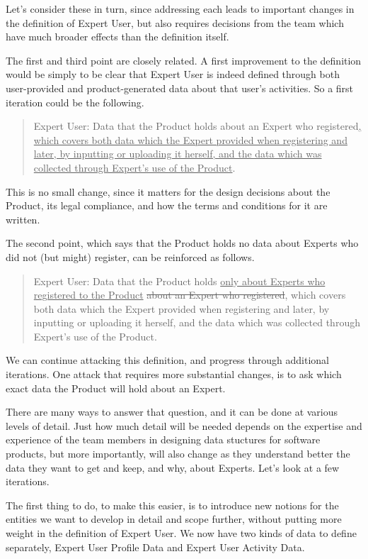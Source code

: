 \documentclass[graybox,envcountchap,sectrefs]{svmono}
\newcommand{\newterm}[1]{\begin{quote}\textsf{#1}\end{quote}}
\newcommand{\nterm}[1]{\textsf{#1}}
\begin{document}
Let's consider these in turn, since addressing each leads to important changes in the definition of \nterm{Expert User}, but also requires decisions from the team which have much broader effects than the definition itself. 

The first and third point are closely related. A first improvement to the definition would be simply to be clear that \nterm{Expert User} is indeed defined through both user-provided and product-generated data about that user's activities. So a first iteration could be the following.

\newterm{Expert User: Data that the Product holds about an Expert who registered\uline{, which covers both data which the Expert provided when registering and later, by inputting or uploading it herself, and the data which was collected through Expert's use of the Product}.}

This is no small change, since it matters for the design decisions about the \nterm{Product}, its legal compliance, and how the terms and conditions for it are written. 

The second point, which says that the \nterm{Product} holds no data about \nterm{Experts} who did not (but might) register, can be reinforced as follows.

\newterm{Expert User: Data that the Product holds \uline{only about Experts who registered to the Product} \sout{about an Expert who registered}, which covers both data which the Expert provided when registering and later, by inputting or uploading it herself, and the data which was collected through Expert's use of the Product.}

We can continue attacking this definition, and progress through additional iterations. One attack that requires more substantial changes, is to ask which exact data the \nterm{Product} will hold about an \nterm{Expert}.

There are many ways to answer that question, and it can be done at various levels of detail. Just how much detail will be needed depends on the expertise and experience of the team members in designing data stuctures for software products, but more importantly, will also change as they understand better the data they want to get and keep, and why, about \nterm{Experts}. Let's look at a few iterations.

The first thing to do, to make this easier, is to introduce new notions for the entities we want to develop in detail and scope further, without putting more weight in the definition of \nterm{Expert User}. We now have two kinds of data to define separately, \nterm{Expert User Profile Data} and \nterm{Expert User Activity Data}.
\end{document}
